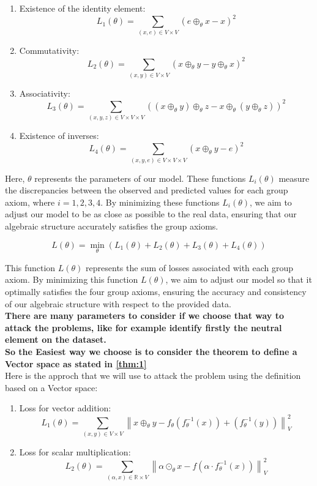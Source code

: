 \documentclass{article}
\begin{document}
    \begin{enumerate}
        \item Existence of the identity element:  \[
            L_1(\theta) = \sum_{(x,e) \in V \times V} (e \oplus_{\theta} x - x)^2
            \]
        \item Commutativity:
        \[
        L_2(\theta) = \sum_{(x, y) \in V \times V} (x \oplus_{\theta} y - y \oplus_{\theta} x)^2
        \]
        \item Associativity:
        \[
        L_3(\theta) = \sum_{(x, y, z) \in V \times V \times V} ((x \oplus_{\theta} y) \oplus_{\theta} z - x \oplus_{\theta} (y \oplus_{\theta} z))^2
        \]
        \item Existence of inverses:
        \[
        L_4(\theta) = \sum_{(x,y,e) \in V \times V \times V} (x \oplus_{\theta} y - e)^2
        \] 
    \end{enumerate}
    
    Here, $\theta$ represents the parameters of our model.
    These functions $L_i(\theta)$ measure the discrepancies
    between the observed and predicted values for each group 
    axiom, where $i = 1, 2, 3, 4$. By minimizing these functions
    $L_i(\theta)$, we aim to adjust our model to be as close as
    possible to the real data, ensuring that our algebraic 
    structure accurately satisfies the group axioms. 

    $$
    L(\theta) = \min_{\theta} (L_1(\theta) + L_2(\theta) + L_3(\theta) + L_4(\theta))
    $$


    This function $L(\theta)$ represents the sum of losses 
    associated with each group axiom. By minimizing 
    this function $L(\theta)$, we aim to adjust our model so
    that it optimally satisfies the four group axioms, 
    ensuring the accuracy and consistency of our 
    algebraic structure with respect to the provided data.\\

    \textbf{There are many parameters to consider  if we choose that way to attack the problems, like for example identify firstly the neutral element on the dataset. \\
    So the Easiest way we choose is to consider the theorem to define a Vector space as stated in \ref{thm:1}}\\

    
    Here is the approch that we will use to attack the problem using the definition based on a Vector space:


    \begin{enumerate}
        \item Loss for vector addition:
        \[
            L_1(\theta) = \sum_{(x, y) \in V \times V} \left\lVert x \oplus_{\theta} y - f_{\theta}(f_{\theta}^{-1}(x)) + (f_{\theta}^{-1}(y)) \right\rVert_{V}^2
        \]
        \item Loss for scalar multiplication:
        \[
            L_2(\theta) = \sum_{(\alpha, x) \in \mathbb{R} \times V} \left\lVert \alpha \odot_{\theta} x - f(\alpha \cdot f_{\theta}^{-1}(x)) \right\rVert_{V}^2
        \]
    \end{enumerate}
\end{document}
